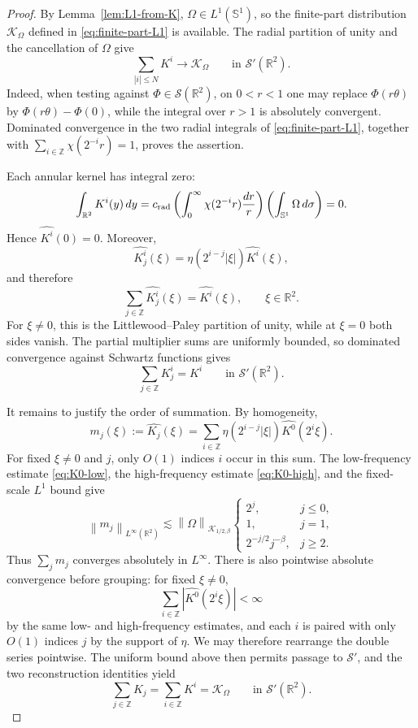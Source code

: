 \documentclass[11pt]{amsart}
\theoremstyle{remark}
\numberwithin{equation}{section}
\newcommand{\R}{\mathbb R}
\newcommand{\Sph}{\mathbb S^1}
\newcommand{\cK}{\mathcal K}
\newcommand{\norm}[1]{\left\lVert #1\right\rVert}
\begin{document}
	\begin{proof}
		By Lemma~\ref{lem:L1-from-K}, \(\Omega\in L^1(\Sph)\), so the finite-part
		distribution \(\mathcal K_\Omega\) defined in \eqref{eq:finite-part-L1} is
		available.  The radial partition of unity and the cancellation of \(\Omega\)
		give
		\[
		\sum_{|i|\le N}K^i\longrightarrow\mathcal K_\Omega
		\qquad\text{in }\mathcal S'(\R^2).
		\]
		Indeed, when testing against \(\Phi\in\mathcal S(\R^2)\), on \(0<r<1\)
		one may replace \(\Phi(r\theta)\) by
		\(\Phi(r\theta)-\Phi(0)\), while the integral over \(r>1\) is absolutely
		convergent.  Dominated convergence in the two radial integrals of
		\eqref{eq:finite-part-L1}, together with
		\(\sum_{i\in\mathbb Z}\chi(2^{-i}r)=1\), proves the assertion.
		
		Each annular kernel has integral zero:
		\[
		\int_{\R^2}K^i(y)\,dy
		=c_{\rm rad}
		\left(\int_0^\infty\chi(2^{-i}r)\frac{dr}{r}\right)
		\left(\int_{\Sph}\Omega\,d\sigma\right)=0.
		\]
		Hence \(\widehat{K^i}(0)=0\). Moreover,
		\[
		\widehat{K_j^i}(\xi)
		=\eta(2^{i-j}|\xi|)\widehat{K^i}(\xi),
		\]
		and therefore
		\[
		\sum_{j\in\mathbb Z}\widehat{K_j^i}(\xi)
		=\widehat{K^i}(\xi),
		\qquad \xi\in\R^2.
		\]
		For \(\xi\ne0\), this is the Littlewood--Paley partition of unity, while
		at \(\xi=0\) both sides vanish. The partial multiplier sums are uniformly
		bounded, so dominated convergence against Schwartz functions gives
		\[
		\sum_{j\in\mathbb Z}K_j^i=K^i
		\qquad\text{in }\mathcal S'(\R^2).
		\]
		
		It remains to justify the order of summation. By homogeneity,
		\[
		m_j(\xi):=\widehat{K_j}(\xi)
		=\sum_{i\in\mathbb Z}
		\eta(2^{i-j}|\xi|)\widehat{K^0}(2^i\xi).
		\]
		For fixed \(\xi\ne0\) and \(j\), only \(O(1)\) indices \(i\) occur in
		this sum. The low-frequency estimate \eqref{eq:K0-low}, the
		high-frequency estimate \eqref{eq:K0-high}, and the fixed-scale
		\(L^1\) bound give
		\[
		\norm{m_j}_{L^\infty(\R^2)}
		\lesssim
		\norm{\Omega}_{\cK_{1/2,\beta}}
		\begin{cases}
			2^j, & j\le0,\\
			1, & j=1,\\
			2^{-j/2}j^{-\beta}, & j\ge2.
		\end{cases}
		\]
		Thus \(\sum_jm_j\) converges absolutely in \(L^\infty\).  There is also
		pointwise absolute convergence before grouping: for fixed \(\xi\ne0\),
		\[
		\sum_{i\in\mathbb Z}|\widehat{K^0}(2^i\xi)|<\infty
		\]
		by the same low- and high-frequency estimates, and each \(i\) is paired
		with only \(O(1)\) indices \(j\) by the support of \(\eta\).  We may
		therefore rearrange the double series pointwise.  The uniform bound above
		then permits passage to \(\mathcal S'\), and the two reconstruction identities
		yield
		\[
		\sum_{j\in\mathbb Z}K_j
		=\sum_{i\in\mathbb Z}K^i
		=\mathcal K_\Omega
		\qquad\text{in }\mathcal S'(\R^2).
		\]
		

\end{proof}
\end{document}
